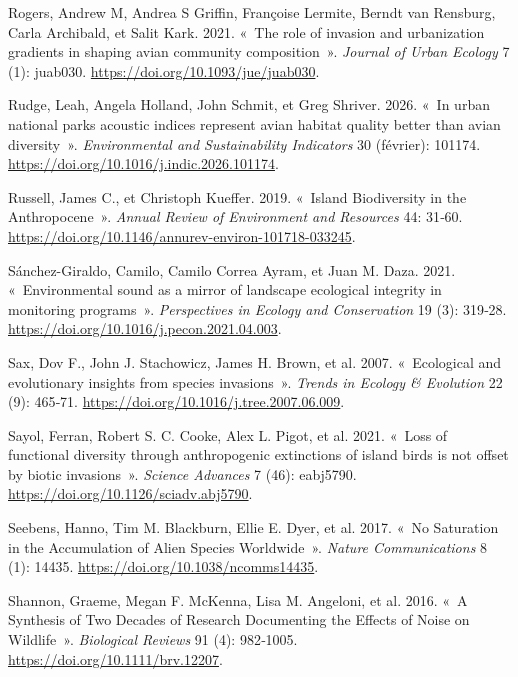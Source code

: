 \documentclass[
  french,
  11pt,
]{stylisharticle}
\newlength{\cslhangindent}
\newenvironment{CSLReferences}[2] %
 {\begin{list}{}{%
  \setlength{\itemindent}{0pt}
  \setlength{\leftmargin}{0pt}
  \setlength{\parsep}{0pt}
  \ifodd #1
   \setlength{\leftmargin}{\cslhangindent}
   \setlength{\itemindent}{-1\cslhangindent}
  \fi
  \setlength{\itemsep}{#2\baselineskip}}}
 {\end{list}}
\begin{document}
\begin{CSLReferences}{1}{1}
Rogers, Andrew M, Andrea S Griffin, Françoise Lermite, Berndt van
Rensburg, Carla Archibald, et Salit Kark. 2021. {«~The role of invasion
and urbanization gradients in shaping avian community composition~»}.
\emph{Journal of Urban Ecology} 7 (1): juab030.
\url{https://doi.org/10.1093/jue/juab030}.

Rudge, Leah, Angela Holland, John Schmit, et Greg Shriver. 2026. {«~In
urban national parks acoustic indices represent avian habitat quality
better than avian diversity~»}. \emph{Environmental and Sustainability
Indicators} 30 (février): 101174.
\url{https://doi.org/10.1016/j.indic.2026.101174}.

Russell, James C., et Christoph Kueffer. 2019. {«~Island Biodiversity in
the Anthropocene~»}. \emph{Annual Review of Environment and Resources}
44: 31‑60. \url{https://doi.org/10.1146/annurev-environ-101718-033245}.

Sánchez-Giraldo, Camilo, Camilo Correa Ayram, et Juan M. Daza. 2021.
{«~Environmental sound as a mirror of landscape ecological integrity in
monitoring programs~»}. \emph{Perspectives in Ecology and Conservation}
19 (3): 319‑28. \url{https://doi.org/10.1016/j.pecon.2021.04.003}.

Sax, Dov F., John J. Stachowicz, James H. Brown, et al. 2007.
{«~Ecological and evolutionary insights from species invasions~»}.
\emph{Trends in Ecology \& Evolution} 22 (9): 465‑71.
\url{https://doi.org/10.1016/j.tree.2007.06.009}.

Sayol, Ferran, Robert S. C. Cooke, Alex L. Pigot, et al. 2021. {«~Loss
of functional diversity through anthropogenic extinctions of island
birds is not offset by biotic invasions~»}. \emph{Science Advances} 7
(46): eabj5790. \url{https://doi.org/10.1126/sciadv.abj5790}.

Seebens, Hanno, Tim M. Blackburn, Ellie E. Dyer, et al. 2017. {«~No
Saturation in the Accumulation of Alien Species Worldwide~»}.
\emph{Nature Communications} 8 (1): 14435.
\url{https://doi.org/10.1038/ncomms14435}.

Shannon, Graeme, Megan F. McKenna, Lisa M. Angeloni, et al. 2016. {«~A
Synthesis of Two Decades of Research Documenting the Effects of Noise on
Wildlife~»}. \emph{Biological Reviews} 91 (4): 982‑1005.
\url{https://doi.org/10.1111/brv.12207}.


\end{CSLReferences}
\end{document}
